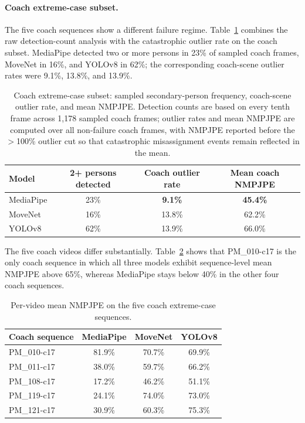 \paragraph{Coach extreme-case subset.}
The five coach sequences show a different failure regime. Table~\ref{tab:coach-detection} combines the raw detection-count analysis with the catastrophic outlier rate on the coach subset. MediaPipe detected two or more persons in 23\% of sampled coach frames, MoveNet in 16\%, and YOLOv8 in 62\%; the corresponding coach-scene outlier rates were 9.1\%, 13.8\%, and 13.9\%.

\begin{table}[htbp]
  \centering
  \caption{Coach extreme-case subset: sampled secondary-person frequency, coach-scene outlier rate, and mean NMPJPE. Detection counts are based on every tenth frame across 1{,}178 sampled coach frames; outlier rates and mean NMPJPE are computed over all non-failure coach frames, with NMPJPE reported before the $>$100\% outlier cut so that catastrophic misassignment events remain reflected in the mean.}
  \label{tab:coach-detection}
  \begin{tabular}{lccc}
    \toprule
    Model & 2+ persons detected & Coach outlier rate & Mean coach NMPJPE \\
    \midrule
    MediaPipe & 23\% & \textbf{9.1\%} & \textbf{45.4\%} \\
    MoveNet   & 16\% & 13.8\% & 62.2\% \\
    YOLOv8    & 62\% & 13.9\% & 66.0\% \\
    \bottomrule
  \end{tabular}
\end{table}

The five coach videos differ substantially. Table~\ref{tab:coach-detail} shows that PM\_010-c17 is the only coach sequence in which all three models exhibit sequence-level mean NMPJPE above 65\%, whereas MediaPipe stays below 40\% in the other four coach sequences.

\begin{table}[htbp]
  \centering
  \caption{Per-video mean NMPJPE on the five coach extreme-case sequences.}
  \label{tab:coach-detail}
  \begin{tabular}{lccc}
    \toprule
    Coach sequence & MediaPipe & MoveNet & YOLOv8 \\
    \midrule
    PM\_010-c17 & 81.9\% & 70.7\% & 69.9\% \\
    PM\_011-c17 & 38.0\% & 59.7\% & 66.2\% \\
    PM\_108-c17 & 17.2\% & 46.2\% & 51.1\% \\
    PM\_119-c17 & 24.1\% & 74.0\% & 73.0\% \\
    PM\_121-c17 & 30.9\% & 60.3\% & 75.3\% \\
    \bottomrule
  \end{tabular}
\end{table}

